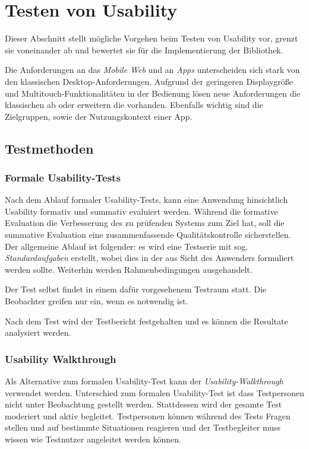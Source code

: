 \section{Testen von Usability}
\label{usability_testing}

Dieser Abschnitt stellt mögliche Vorgehen beim Testen von Usability vor, grenzt sie voneinander ab und bewertet sie für die Implementierung der Bibliothek. 

Die Anforderungen an das \textit{Mobile Web} und an \textit{Apps} unterscheiden sich stark von den klassischen Desktop-Anforderungen. 
Aufgrund der geringeren Displaygröße und Multitouch-Funktionalitäten in der Bedienung lösen neue Anforderungen die klassischen ab oder erweitern die vorhanden. 
Ebenfalls wichtig sind die Zielgruppen, sowie der Nutzungskontext einer App. 

\subsection{Testmethoden \label{sec:testmethoden}}

\subsubsection{Formale Usability-Tests \label{sec:formal-usability-test}}

Nach dem Ablauf formaler Usability-Tests, kann eine Anwendung hinsichtlich Usability formativ und summativ evaluiert werden. 
Während die formative Evaluation die Verbesserung des zu prüfenden Systems zum Ziel hat, soll die summative Evaluation eine zusammenfassende Qualitätskontrolle sicherstellen. Der allgemeine Ablauf ist folgender: es wird eine Testserie mit sog. \textit{Standardaufgaben} erstellt, wobei dies in der aus Sicht des Anwenders formuliert werden sollte. %
Weiterhin werden Rahmenbedingungen ausgehandelt. \cite[vgl.][86\psq]{usabilityEngineeringKompakt}

Der Test selbst findet in einem dafür vorgesehenem Testraum statt. 
Die Beobachter greifen nur ein, wenn es notwendig ist. 

Nach dem Test wird der Testbericht festgehalten und es können die Resultate analysiert werden. 

\subsubsection{Usability Walkthrough}

Als Alternative zum formalen Usability-Test kann der \textit{Usability-Walkthrough} verwendet werden. 
Unterschied zum formalen Usability-Test ist dass Testpersonen nicht unter Beobachtung gestellt werden. 
Stattdessen wird der gesamte Test moderiert und aktiv begleitet. 
Testpersonen können während des Tests Fragen stellen und auf bestimmte Situationen reagieren und der Testbegleiter muss wissen wie Testnutzer angeleitet werden können. \cite[vgl.][93]{usabilityEngineeringKompakt}

